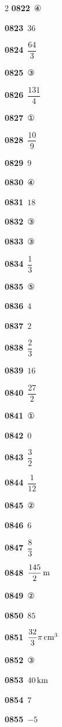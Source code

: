 \documentclass[10pt,a4paper]{article}
\begin{document}
\begin{multicols}{2}
\noindent\textbf{0822}\ ④\par
\noindent\textbf{0823}\ $36$\par
\noindent\textbf{0824}\ $\dfrac{64}{3}$\par
\noindent\textbf{0825}\ ③\par
\noindent\textbf{0826}\ $\dfrac{131}{4}$\par
\noindent\textbf{0827}\ ①\par
\noindent\textbf{0828}\ $\dfrac{10}{9}$\par
\noindent\textbf{0829}\ $9$\par
\noindent\textbf{0830}\ ④\par
\noindent\textbf{0831}\ $18$\par
\noindent\textbf{0832}\ ③\par
\noindent\textbf{0833}\ ③\par
\noindent\textbf{0834}\ $\dfrac{1}{3}$\par
\noindent\textbf{0835}\ ⑤\par
\noindent\textbf{0836}\ $4$\par
\noindent\textbf{0837}\ $2$\par
\noindent\textbf{0838}\ $\dfrac{2}{3}$\par
\noindent\textbf{0839}\ $16$\par
\noindent\textbf{0840}\ $\dfrac{27}{2}$\par
\noindent\textbf{0841}\ ①\par
\noindent\textbf{0842}\ $0$\par
\noindent\textbf{0843}\ $\dfrac{3}{2}$\par
\noindent\textbf{0844}\ $\dfrac{1}{12}$\par
\noindent\textbf{0845}\ ②\par
\noindent\textbf{0846}\ $6$\par
\noindent\textbf{0847}\ $\dfrac{8}{3}$\par
\noindent\textbf{0848}\ $\dfrac{145}{2}\mkern3mu \mathrm{m}$\par
\noindent\textbf{0849}\ ②\par
\noindent\textbf{0850}\ $85$\par
\noindent\textbf{0851}\ $\dfrac{32}{3}\pi\mkern3mu \mathrm{cm}^3$\par
\noindent\textbf{0852}\ ③\par
\noindent\textbf{0853}\ $40\mkern3mu \mathrm{km}$\par
\noindent\textbf{0854}\ $7$\par
\noindent\textbf{0855}\ $-5$\par

\end{multicols}
\end{document}
